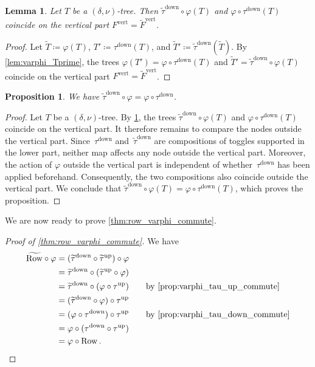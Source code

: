 \documentclass[11pt]{amsart}
\newcommand{\up}{^{\operatorname{up}}}
\newcommand{\down}{^{\operatorname{down}}}
\newcommand{\ver}{^{\operatorname{vert}}}
\DeclareMathOperator{\row}{Row}
\newtheorem{proposition}[theorem]{Proposition}
\newtheorem{lemma}[theorem]{Lemma}
\theoremstyle{definition}
\begin{document}
\begin{lemma} \label{lem:varphi_taudown_commute_verticalpart}
Let $T$ be a $(\delta,\nu)$-tree. Then $\widetilde{\tau}\down \circ \varphi(T)$ and $ \varphi \circ \tau\down(T)$ coincide on the vertical part $F\ver = \widetilde F\ver$.
\end{lemma}

\begin{proof}
Let $\widetilde T\coloneqq \varphi(T)$, $T'\coloneqq \tau\down(T)$, and $\widetilde T'\coloneqq\widetilde{\tau}\down(\widetilde T)$. By \cref{lem:varphi_Tprime}, the trees $\varphi(T')=\varphi\circ\tau\down(T)$ and $\widetilde T' = \widetilde{\tau}\down \circ \varphi(T)$ coincide on the vertical part $F\ver=\widetilde F\ver$.
\end{proof}

\begin{proposition} \label{prop:varphi_tau_down_commute}
We have $\widetilde\tau\down \circ \varphi = \varphi \circ \tau\down$.
\end{proposition}

\begin{proof}
Let $T$ be a $(\delta,\nu)$-tree. By \cref{lem:varphi_taudown_commute_verticalpart}, the trees $\widetilde{\tau}\down \circ \varphi(T)$ and $\varphi \circ \tau\down(T)$ coincide on the vertical part. It therefore remains to compare the nodes outside the vertical part. Since~$\tau\down$ and~$\widetilde{\tau}\down$ are compositions of toggles supported in the lower part, neither map affects any node outside the vertical part. Moreover, the action of $\varphi$ outside the vertical part is independent of whether~$\tau\down$ has been applied beforehand. Consequently, the two compositions also coincide outside the vertical part. We conclude that $\widetilde{\tau}\down \circ \varphi(T) =
\varphi \circ \tau\down(T)$, which proves the proposition.
\end{proof}

We are now ready to prove \cref{thm:row_varphi_commute}.

\begin{proof}[Proof of \cref{thm:row_varphi_commute}]
We have
\begin{align*}
\widetilde{\row} \circ \varphi &= (\widetilde{\tau}\down \circ \widetilde{\tau}\up) \circ \varphi \\
&= \widetilde{\tau}\down \circ (\widetilde{\tau}\up \circ \varphi) \\
&= \widetilde{\tau}\down \circ (\varphi \circ \tau\up) \qquad\text{by \cref{prop:varphi_tau_up_commute}} \\
&= (\widetilde{\tau}\down \circ \varphi) \circ \tau\up \\
&= (\varphi \circ \tau\down) \circ \tau\up \qquad\text{by \cref{prop:varphi_tau_down_commute}} \\
&= \varphi \circ (\tau\down \circ \tau\up) \\
&= \varphi \circ \row. \qedhere
\end{align*}
\end{proof}
\end{document}
